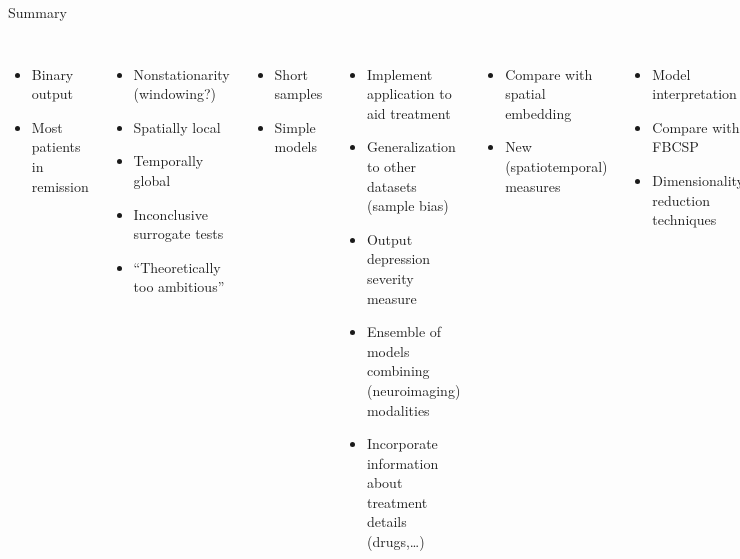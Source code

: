 \documentclass{beamer}
\begin{document}
\begin{frame}[t]{Summary}
  \centering
  \begin{columns}[t]
    \begin{itemize}
      \item Binary output
      \item Most patients in remission %
    \end{itemize}
        \begin{itemize}
          \item Nonstationarity {\scriptsize (windowing?)} 
          \item Spatially local %
          \item Temporally global
          \item Inconclusive surrogate tests
          \item ``Theoretically too ambitious''
        \end{itemize}
        \begin{itemize}
          \item Short samples
          \item Simple models
        \end{itemize}

    \scriptsize
    \begin{itemize}
      \item Implement application to aid treatment
      \item Generalization to other datasets {\scriptsize (sample bias) }
      \item Output depression severity measure
      \item Ensemble of models combining (neuroimaging) modalities
      \item Incorporate information about treatment details (drugs,\ldots)
    \end{itemize}
        \begin{itemize}
          \item Compare with spatial embedding
          \item New (spatiotemporal) measures
        \end{itemize}
        \begin{itemize}
          \item Model interpretation %
          \item Compare with FBCSP
          \item Dimensionality reduction techniques
        \end{itemize}
  \end{columns}
\end{frame}
\end{document}
